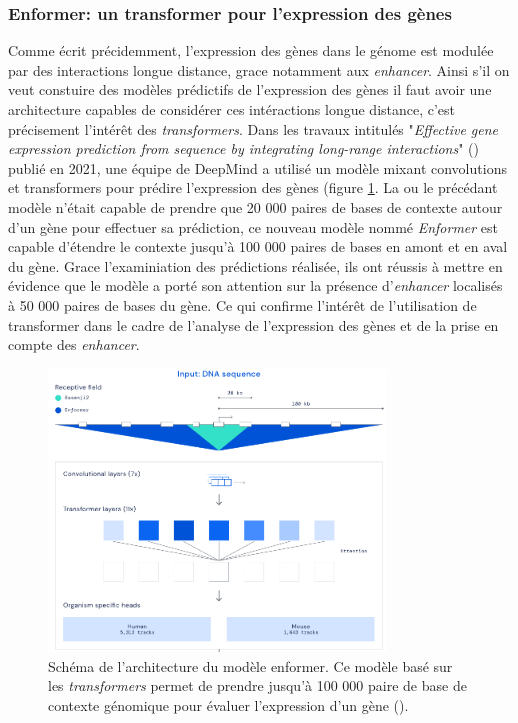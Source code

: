 \subsubsection{Enformer: un transformer pour l'expression des gènes}
Comme écrit précidemment, l'expression des gènes dans le génome est modulée par des interactions longue distance, grace notamment aux \textit{enhancer}. Ainsi s'il on veut constuire des modèles prédictifs de l'expression des gènes il faut avoir une architecture capables de considérer ces intéractions longue distance, c'est précisement l'intérêt des \textit{transformers}. Dans les travaux intitulés "\textit{Effective gene expression prediction from sequence by integrating long-range interactions}" (\cite{avsec_effective_2021}) publié en 2021, une équipe de DeepMind a utilisé un modèle mixant convolutions et transformers pour prédire l'expression des gènes (figure \ref{fig:enformer}. La ou le précédant modèle n'était capable de prendre que 20 000 paires de bases de contexte autour d'un gène pour effectuer sa prédiction, ce nouveau modèle nommé \textit{Enformer} est capable d'étendre le contexte jusqu'à 100 000 paires de bases en amont et en aval du gène. Grace l'examiniation des prédictions réalisée, ils ont réussis à mettre en évidence que le modèle a porté son attention sur la présence d'\textit{enhancer} localisés à 50 000 paires de bases du gène. Ce qui confirme l'intérêt de l'utilisation de transformer dans le cadre de l'analyse de l'expression des gènes et de la prise en compte des \textit{enhancer}.
\begin{figure}[!htbp]
 \centering
 \includegraphics[width=0.8\textwidth]{figures/enformer.png}
 \caption[Schéma de l'architecture du modèle enformer]{Schéma de l'architecture du modèle enformer. Ce modèle basé sur les \textit{transformers} permet de prendre jusqu'à 100 000 paire de base de contexte génomique pour évaluer l'expression d'un gène (\cite{avsec_effective_2021}).}
 \label{fig:enformer}
\end{figure}
